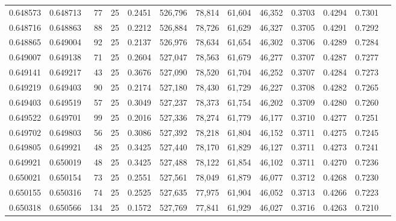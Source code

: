 \begin{tabular}{rrrrrrrrrrrrr}
0.648573 & 0.648713 &    77 &  25 &                                     0.2451 & 526,796 &  78,814 &  61,604 &  46,352 & 0.3703 & 0.4294 & 0.7301 \\
0.648716 & 0.648863 &    88 &  25 &                                     0.2212 & 526,884 &  78,726 &  61,629 &  46,327 & 0.3705 & 0.4291 & 0.7292 \\
0.648865 & 0.649004 &    92 &  25 &                                     0.2137 & 526,976 &  78,634 &  61,654 &  46,302 & 0.3706 & 0.4289 & 0.7284 \\
0.649007 & 0.649138 &    71 &  25 &                                     0.2604 & 527,047 &  78,563 &  61,679 &  46,277 & 0.3707 & 0.4287 & 0.7277 \\
0.649141 & 0.649217 &    43 &  25 &                                     0.3676 & 527,090 &  78,520 &  61,704 &  46,252 & 0.3707 & 0.4284 & 0.7273 \\
0.649219 & 0.649403 &    90 &  25 &                                     0.2174 & 527,180 &  78,430 &  61,729 &  46,227 & 0.3708 & 0.4282 & 0.7265 \\
0.649403 & 0.649519 &    57 &  25 &                                     0.3049 & 527,237 &  78,373 &  61,754 &  46,202 & 0.3709 & 0.4280 & 0.7260 \\
0.649522 & 0.649701 &    99 &  25 &                                     0.2016 & 527,336 &  78,274 &  61,779 &  46,177 & 0.3710 & 0.4277 & 0.7251 \\
0.649702 & 0.649803 &    56 &  25 &                                     0.3086 & 527,392 &  78,218 &  61,804 &  46,152 & 0.3711 & 0.4275 & 0.7245 \\
0.649805 & 0.649921 &    48 &  25 &                                     0.3425 & 527,440 &  78,170 &  61,829 &  46,127 & 0.3711 & 0.4273 & 0.7241 \\
0.649921 & 0.650019 &    48 &  25 &                                     0.3425 & 527,488 &  78,122 &  61,854 &  46,102 & 0.3711 & 0.4270 & 0.7236 \\
0.650021 & 0.650154 &    73 &  25 &                                     0.2551 & 527,561 &  78,049 &  61,879 &  46,077 & 0.3712 & 0.4268 & 0.7230 \\
0.650155 & 0.650316 &    74 &  25 &                                     0.2525 & 527,635 &  77,975 &  61,904 &  46,052 & 0.3713 & 0.4266 & 0.7223 \\
0.650318 & 0.650566 &   134 &  25 &                                     0.1572 & 527,769 &  77,841 &  61,929 &  46,027 & 0.3716 & 0.4263 & 0.7210 \\

\end{tabular}
